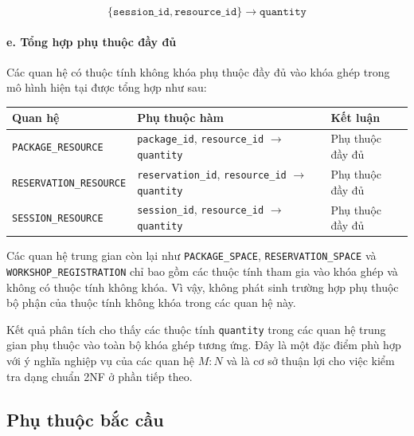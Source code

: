 $$
\{
\texttt{session\_id},
\texttt{resource\_id}
\}
\rightarrow
\texttt{quantity}
$$

\paragraph{e. Tổng hợp phụ thuộc đầy đủ}\mbox{}\par

Các quan hệ có thuộc tính không khóa phụ thuộc đầy đủ vào khóa ghép trong mô hình hiện tại được tổng hợp như sau:

\begin{center}
\scriptsize
\begin{tabular}{p{.28\linewidth} p{.32\linewidth} p{.25\linewidth}}
\toprule
Quan hệ & Phụ thuộc hàm & Kết luận \\
\midrule

\texttt{PACKAGE\_RESOURCE} &
{\texttt{package\_id}, \texttt{resource\_id}} $\rightarrow$ \texttt{quantity} &
Phụ thuộc đầy đủ \\

\texttt{RESERVATION\_RESOURCE} &
{\texttt{reservation\_id}, \texttt{resource\_id}} $\rightarrow$ \texttt{quantity} &
Phụ thuộc đầy đủ \\

\texttt{SESSION\_RESOURCE} &
{\texttt{session\_id}, \texttt{resource\_id}} $\rightarrow$ \texttt{quantity} &
Phụ thuộc đầy đủ \\

\bottomrule
\end{tabular}
\end{center}

Các quan hệ trung gian còn lại như \texttt{PACKAGE\_SPACE}, \texttt{RESERVATION\_SPACE} và \texttt{WORKSHOP\_REGISTRATION} chỉ bao gồm các thuộc tính tham gia vào khóa ghép và không có thuộc tính không khóa. Vì vậy, không phát sinh trường hợp phụ thuộc bộ phận của thuộc tính không khóa trong các quan hệ này.

Kết quả phân tích cho thấy các thuộc tính \texttt{quantity} trong các quan hệ trung gian phụ thuộc vào toàn bộ khóa ghép tương ứng. Đây là một đặc điểm phù hợp với ý nghĩa nghiệp vụ của các quan hệ $M:N$ và là cơ sở thuận lợi cho việc kiểm tra dạng chuẩn 2NF ở phần tiếp theo.

\subsection{Phụ thuộc bắc cầu}\mbox{}\par

